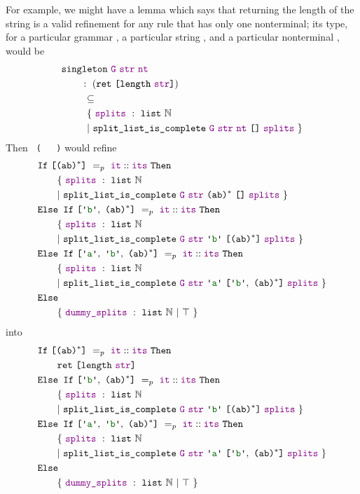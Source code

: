       For example, we might have a lemma  which says that returning the length of the string is a valid refinement for any rule that has only one nonterminal; its type, for a particular grammar , a particular string , and a particular nonterminal , would be
\begin{align*}
& \fname{singleton}~\farg{G}~\farg{str}~\farg{nt} \\
& \qquad:~(\fname{ret}~\valuelist{\fname{length}~\farg{str}}) \\
&\qquad~\subseteq\\
&\ndcompfor[\phantom{:~}\qquad]{\nt{\farg{nt}}}{\nil}
\end{align*}
    Then \texttt{~(~\termhole~\termhole~)} would refine 
\begin{align*}
& \fname{If}~\valuelist{\nt{(ab)\ensuremath{^*}}}~=_p~\cons{\farg{it}}{\farg{its}}~\fname{Then} \\
&\ndcompfor[\qquad]{\nt{(ab)\ensuremath{^*}}}{\nil} \\
& \fname{Else~If}~\valuelist{\terminal{b},~\nt{(ab)\ensuremath{^*}}}~=_p~\cons{\farg{it}}{\farg{its}}~\fname{Then} \\
&\ndcompfor[\qquad]{\terminal{b}}{\valuelist{\nt{(ab)\ensuremath{^*}}}} \\
& \fname{Else~If}~\valuelist{\terminal{a},~\terminal{b},~\nt{(ab)\ensuremath{^*}}}~=_p~\cons{\farg{it}}{\farg{its}}~\fname{Then} \\
&\ndcompfor[\qquad]{\terminal{a}}{\valuelist{\terminal{b},~\nt{(ab)\ensuremath{^*}}}} \\
& \fname{Else} \\
&\qquad\{~\farg{dummy\_splits}~:~\indname{list}~\mathbb{N}~|~\True~\}
\end{align*}
into
\begin{align*}
& \fname{If}~\valuelist{\nt{(ab)\ensuremath{^*}}}~=_p~\cons{\farg{it}}{\farg{its}}~\fname{Then} \\
&\qquad\fname{ret}~\valuelist{\fname{length}~\farg{str}}\\
& \fname{Else~If}~\valuelist{\terminal{b},~\nt{(ab)\ensuremath{^*}}}~=_p~\cons{\farg{it}}{\farg{its}}~\fname{Then} \\
&\ndcompfor[\qquad]{\terminal{b}}{\valuelist{\nt{(ab)\ensuremath{^*}}}} \\
& \fname{Else~If}~\valuelist{\terminal{a},~\terminal{b},~\nt{(ab)\ensuremath{^*}}}~=_p~\cons{\farg{it}}{\farg{its}}~\fname{Then} \\
&\ndcompfor[\qquad]{\terminal{a}}{\valuelist{\terminal{b},~\nt{(ab)\ensuremath{^*}}}} \\
& \fname{Else} \\
&\qquad\{~\farg{dummy\_splits}~:~\indname{list}~\mathbb{N}~|~\True~\}
\end{align*}

